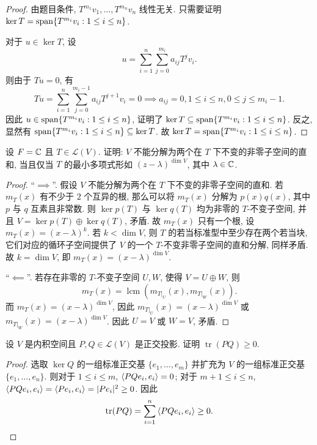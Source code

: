 \documentclass{article}
\begin{document}
\begin{proof}
  由题目条件, \( T^{m_1}v_1,\dots,T^{m_n}v_n \) 线性无关. 只需要证明 \( \ker T=\operatorname{span}\{T^{m_i}v_i: 1\le i\le n\} \). 

  对于 \( u\in\ker T \), 设
  \[ u = \sum_{i=1}^{n} \sum_{j=0}^{m_i} a_{ij} T^j v_i. \]
  则由于 \( Tu=0 \), 有
  \[ T u = \sum_{i=1}^{n} \sum_{j=0}^{m_i-1} a_{ij} T^{j+1} v_i = 0
  \implies a_{ij}=0, 1\le i\le n, 0\le j\le m_i-1. \]
  因此 \( u \in \operatorname{span}\{T^{m_i}v_i: 1\le i\le n\} \), 证明了 \( \ker T \subseteq \operatorname{span}\{T^{m_i}v_i: 1\le i\le n\} \). 反之, 显然有 \( \operatorname{span}\{T^{m_i}v_i: 1\le i\le n\} \subseteq \ker T \). 故 \( \ker T=\operatorname{span}\{T^{m_i}v_i: 1\le i\le n\} \).
\end{proof}



\begin{problem}[8C-14]
设 $F = \mathbb{C}$ 且 $T \in \mathcal{L}(V)$. 证明: $V$ 不能分解为两个在 $T$ 下不变的非零子空间的直和, 当且仅当 $T$ 的最小多项式形如 $(z-\lambda)^{\dim V}$, 其中 $\lambda \in \mathbb{C}$.
\end{problem}

\begin{proof}
  ``\( \implies \)''. 假设 \( V \) 不能分解为两个在 \( T \) 下不变的非零子空间的直和. 若 \( m_T(x) \) 有不少于 \( 2 \) 个互异的根, 那么可以将 \( m_T(x) \) 分解为 \( p(x)q(x) \), 其中 \( p \) 与 \( q \) 互素且非常数. 则 \( \ker p(T) \) 与 \( \ker q(T) \) 均为非零的 \( T \)-不变子空间, 并且 \( V=\ker p(T) \oplus \ker q(T) \), 矛盾. 故 \( m_T(x) \) 只有一个根, 设 \( m_T(x) = (x-\lambda)^k \). 若 \( k < \dim V \), 则 \( T \) 的若当标准型中至少存在两个若当块, 它们对应的循环子空间提供了 \( V \) 的一个 \( T \)-不变非零子空间的直和分解, 同样矛盾. 故 \( k = \dim V \), 即 \( m_T(x) = (x-\lambda)^{\dim V} \).

  ``\( \impliedby \)''. 若存在非零的 \( T \)-不变子空间 \( U,W \), 使得 \( V=U\oplus W \), 则 
  \[ m_T(x) = \operatorname{lcm}(m_{T|_U}(x), m_{T|_W}(x)). \]
  而  \( m_T(x)=(x-\lambda)^{\dim V} \), 因此 \( m_{T|_U}(x)=(x-\lambda)^{\dim V} \) 或 \( m_{T|_W}(x)=(x-\lambda)^{\dim V} \). 因此 \( U=V \) 或 \( W=V \), 矛盾.
\end{proof}



\begin{problem}[8D-6]
设 $V$ 是内积空间且 $P, Q \in \mathcal{L}(V)$ 是正交投影. 证明 $\operatorname{tr}(PQ) \ge 0$.
\end{problem}

\begin{proof}
  选取 \( \ker Q \) 的一组标准正交基 \( \{e_1,\dots,e_m\} \) 并扩充为 \( V \) 的一组标准正交基 \( \{e_1,\dots,e_n\} \). 则对于 \( 1\le i\le m \), \( \left\langle PQe_i, e_i \right\rangle=0 \); 对于 \( m+1\le i\le n \), \( \left\langle PQe_i, e_i \right\rangle = \left\langle Pe_i, e_i \right\rangle = |Pe_i|^2 \ge 0 \). 因此
  \[ \operatorname{tr}(PQ) = \sum_{i=1}^n \left\langle PQe_i, e_i \right\rangle \ge 0. \]
\end{proof}
\end{document}
